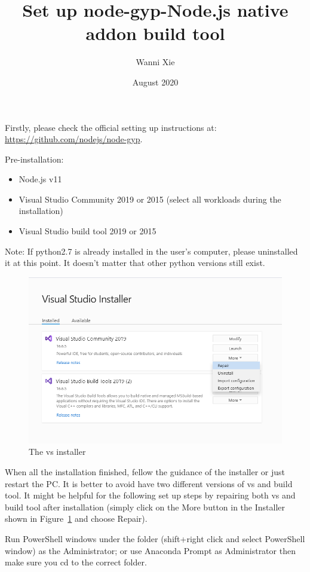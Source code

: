 \documentclass{article}
\title{\textbf{Set up node-gyp-Node.js native addon build tool}}
\author{Wanni Xie\\
\emial{wx243@cam.ac.uk}}
\date{August 2020}
\begin{document}
\maketitle

Firstly, please check the official setting up instructions at: \url{https://github.com/nodejs/node-gyp}.
 
Pre-installation: 
\begin{itemize}
    \item Node.js v11
    \item Visual Studio Community 2019 or 2015 (select all workloads during the installation)
    \item Visual Studio build tool 2019 or 2015
\end{itemize}
Note: If python2.7 is already installed in the user’s computer, please uninstalled it at this point. It doesn’t matter that other python versions still exist.
 
\FloatBarrier
\begin{figure}[h!]
\centering
\includegraphics[scale=0.7]{installer.png}
\caption{The vs installer}
\label{fig:installer}
\end{figure}
\FloatBarrier

When all the installation finished, fellow the guidance of the installer or just restart the PC. It is better to avoid have two different versions of vs and build tool. It might be helpful for the following set up steps by repairing both vs and build tool after installation (simply click on the More button in the Installer shown in Figure~\ref{fig:installer} and choose Repair).

Run PowerShell windows under the folder (shift+right click and select PowerShell window) as the Administrator; or use Anaconda Prompt as Administrator then make sure you cd to the correct folder.
\end{document}
